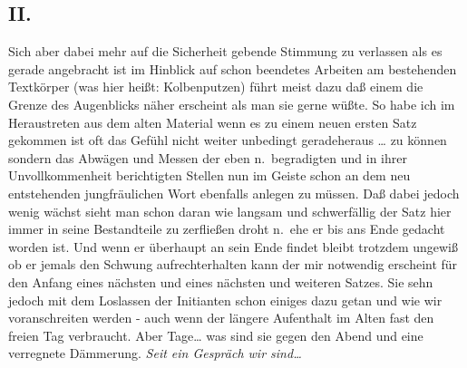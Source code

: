 \documentclass[
]{article}
\author{}
\date{\vspace{-2.5em}}
\begin{document}
\subsection{II.}\label{ii.}

Sich aber dabei mehr auf die Sicherheit gebende Stimmung zu verlassen
als es gerade angebracht ist im Hinblick auf schon beendetes Arbeiten am
bestehenden Textkörper (was hier heißt: Kolbenputzen) führt meist dazu
daß einem die Grenze des Augenblicks näher erscheint als man sie gerne
wüßte. So habe ich im Heraustreten aus dem alten Material wenn es zu
einem neuen ersten Satz gekommen ist oft das Gefühl nicht weiter
unbedingt geradeheraus \ldots{} zu können sondern das Abwägen und Messen
der eben n.~begradigten und in ihrer Unvollkommenheit berichtigten
Stellen nun im Geiste schon an dem neu entstehenden jungfräulichen Wort
ebenfalls anlegen zu müssen. Daß dabei jedoch wenig wächst sieht man
schon daran wie langsam und schwerfällig der Satz hier immer in seine
Bestandteile zu zerfließen droht n.~ehe er bis ans Ende gedacht worden
ist. Und wenn er überhaupt an sein Ende findet bleibt trotzdem ungewiß
ob er jemals den Schwung aufrechterhalten kann der mir notwendig
erscheint für den Anfang eines nächsten und eines nächsten und weiteren
Satzes. Sie sehn jedoch mit dem Loslassen der Initianten schon einiges
dazu getan und wie wir voranschreiten werden - auch wenn der längere
Aufenthalt im Alten fast den freien Tag verbraucht. Aber Tage\ldots{}
was sind sie gegen den Abend und eine verregnete Dämmerung. \emph{Seit
ein Gespräch wir sind\ldots{}}
\end{document}

